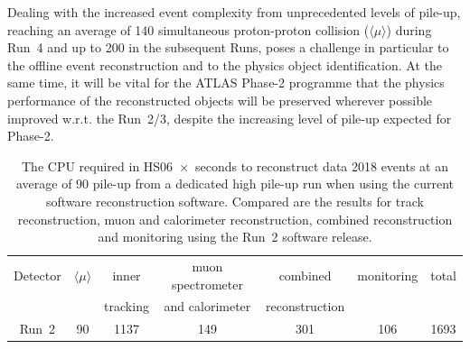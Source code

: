 \label{sec:reco}

Dealing with the increased event complexity from unprecedented levels of pile-up, reaching an average of 140 simultaneous proton-proton collision ($\langle\mu\rangle$) during Run~4 and up to 200 in the subsequent Runs, poses a challenge in particular to the offline event reconstruction and to the physics object identification. At the same time, it will be vital for the ATLAS Phase-2 programme that the physics performance of the reconstructed objects will be preserved wherever possible improved w.r.t. the Run~2/3, despite the increasing level of pile-up expected for Phase-2.
%
\begin{table}[htb!]
  \caption{The CPU required in HS06~$\times$~seconds to reconstruct data 2018 events at an average of 90 pile-up from a dedicated high pile-up run when using the current software reconstruction software. Compared are the results for track reconstruction, muon and calorimeter reconstruction, combined reconstruction and monitoring using the Run~2 software release.}
  \label{tab:RecoCPU}
  \centering
  \begin{tabular}{|c|c||c|c|c|c||c|} \hline
    Detector & $\langle\mu\rangle$ & inner    & muon spectrometer & combined       & monitoring & total \\
             &                     & tracking & and calorimeter   & reconstruction &           &        \\ \hline
    Run~2    & 90                  & 1137     & 149               & 301            & 106       & 1693  \\ \hline
    \end{tabular}
\end{table}

